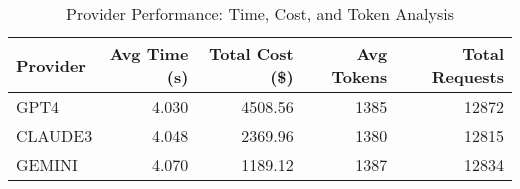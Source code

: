 \begin{table}[htbp]
\centering
\caption{Provider Performance: Time, Cost, and Token Analysis}
\label{tab:provider_performance}
\begin{tabular}{lrrrr}
\toprule
Provider & Avg Time (s) & Total Cost (\$) & Avg Tokens & Total Requests \\
\midrule
GPT4 & 4.030 & 4508.56 & 1385 & 12872 \\
CLAUDE3 & 4.048 & 2369.96 & 1380 & 12815 \\
GEMINI & 4.070 & 1189.12 & 1387 & 12834 \\
\bottomrule
\end{tabular}
\end{table}